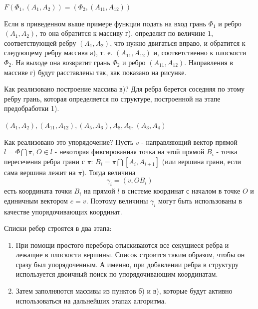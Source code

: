 \documentclass[a4paper,12pt, titlepage]{article}
\begin{document}
	\begin{flushleft}
		 $F(\Phi_{1}, (A_{1}, A_{2})) = (\Phi_{2}, (A_{11}, A_{12}))$
	\end{flushleft}
	\begin{flushleft}
		Если в приведенном выше примере функции подать на вход грань $\Phi_{1}$ и ребро 
		$(A_{1}, A_{2})$, то она обратится к массиву г), определит по величине $1$, соответствующей
		ребру $(A_{1}, A_{2})$, что нужно двигаться вправо, и обратится к следующему ребру массива а),
		т. е. $(A_{11}, A_{12})$ и, соответственно к плоскости $\Phi_{2}$. На выходе она возвратит 
		грань $\Phi_{2}$ и ребро $(A_{11}, A_{12})$. Направления в массиве г) будут расставлены так, 
		как показано на рисунке.
	\end{flushleft}
	\begin{flushleft}
		Как реализовано построение массива в)? Для ребра берется соседняя по этому ребру грань, которая
		определяется по структуре, построенной на этапе предобработки 1).
	\end{flushleft}
	\begin{flushleft}
		$(A_{1}, A_{2}), (A_{11}, A_{12}), (A_{5}, A_{6}), A_{8}, A_{9}, (A_{3}, A_{4})$
	\end{flushleft}
	\begin{flushleft}
		Как реализовано это упорядочение? Пусть $v$ - направляющий вектор прямой 
		$l = \Phi \bigcap \pi$, $O \in l$  - некоторая фиксированная точка на этой прямой
		$B_{i}$ - точка пересечения ребра грани с $\pi$: 
		$B_{i} = \pi \bigcap [A_{i}, A_{i + 1}]$ (или вершина грани, если сама вершина 
		лежит на $\pi$). Тогда величина
		$$
			\gamma_{i} = (v, O B_{i})
		$$
		есть координата точки $B_{i}$ на прямой $l$ в системе координат с началом в точке
		$O$ и единичным вектором $e = v$. Поэтому величины $\gamma_{i}$ могут быть 
		использованы в качестве упорядочивающих координат. 
	\end{flushleft}
	\begin{flushleft}
		Списки ребер строятся в два этапа:
		\begin{enumerate}
			\item При помощи простого перебора отыскиваются все секущиеся ребра и лежащие в 
			плоскости вершины. Список строится таким образом, чтобы он сразу был упорядоченным.
			А именно, при добавлении ребра в структуру используется двоичный поиск по 
			упорядочивающим координатам.
			\item Затем заполняются массивы из пунктов б) и в), которые будут активно 
			использоваться на дальнейших этапах алгоритма.
		\end{enumerate}
	\end{flushleft}
\end{document}
